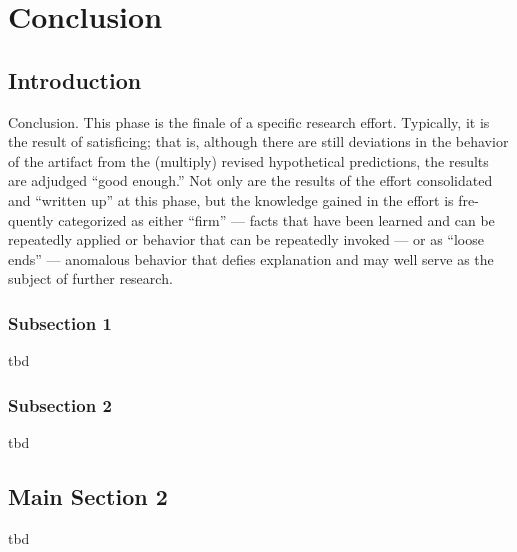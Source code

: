 
\chapter{Conclusion} %

\label{ChapterConclusion} %


\section{Introduction}

Conclusion. This phase is the finale of a specific research effort. Typically, it is the result of satisficing; that is, although there are still deviations in the behavior of the artifact from the (multiply) revised hypothetical predictions, the results are adjudged “good enough.” Not only are the results of the effort consolidated and “written up” at this phase, but the knowledge gained in the effort is fre- quently categorized as either “firm” — facts that have been learned and can be repeatedly applied or behavior that can be repeatedly invoked — or as “loose ends” — anomalous behavior that defies explanation and may well serve as the subject of further research.
\cite{Vaishnavi2008}


\subsection{Subsection 1}

tbd



\subsection{Subsection 2}

tbd



\section{Main Section 2}

tbd